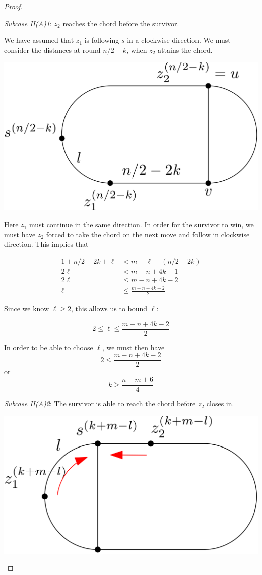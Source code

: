 \documentclass[letterpaper, 10pt]{article}
\begin{document}
\begin{proof}
\begin{proofpart}
\emph{Subcase II(A)1}: $z_2$ reaches the chord before the survivor.

We have assumed that $z_1$ is following $s$ in a clockwise direction. We must consider the distances at
round $n/2 - k$, when $z_2$ attains the chord.

\begin{center}
\includegraphics[scale=0.15]{diagramCaseIIA1_2}
\end{center}

Here $z_1$ must continue in the same direction. In order for the survivor to win, we must have
$z_2$ forced to take the chord on the next move and follow in clockwise direction. This implies that

\begin{align*}
1 + n/2-2k + \ell & < m - \ell - (n/2-2k)   \\
2\ell             & < m -n +4k -1           \\
2\ell             & \leq m - n +4k -2       \\
\ell              & \leq \frac{m-n+4k-2}{2}
\end{align*}

Since we know $\ell \geq 2$, this allows us to bound $\ell$:

\[ 2 \leq \ell \leq \frac{m-n+4k-2}{2} \]

In order to be able to choose $\ell$, we must then have
\[ 2 \leq \frac{m -n + 4k -2}{2} \]
or
\[ k \geq \frac{n-m+6}{4} \]

\emph{Subcase II(A)2}: The survivor is able to reach the chord before $z_2$ closes in.

\begin{center}
\includegraphics[scale=0.15]{diagramCaseIIA2_1}
\end{center}


\end{proofpart}
\end{proof}
\end{document}
